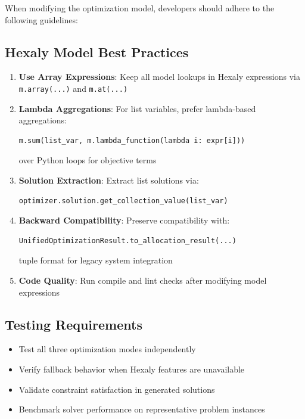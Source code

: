 \documentclass[11pt,a4paper]{article}
\begin{document}
When modifying the optimization model, developers should adhere to the following guidelines:

\subsection{Hexaly Model Best Practices}

\begin{enumerate}
    \item \textbf{Use Array Expressions}: Keep all model lookups in Hexaly expressions via \texttt{m.array(...)} and \texttt{m.at(...)}
    
    \item \textbf{Lambda Aggregations}: For list variables, prefer lambda-based aggregations:
    \begin{lstlisting}[style=pythoncode]
m.sum(list_var, m.lambda_function(lambda i: expr[i]))
    \end{lstlisting}
    over Python loops for objective terms
    
    \item \textbf{Solution Extraction}: Extract list solutions via:
    \begin{lstlisting}[style=pythoncode]
optimizer.solution.get_collection_value(list_var)
    \end{lstlisting}
    
    \item \textbf{Backward Compatibility}: Preserve compatibility with:
    \begin{lstlisting}[style=pythoncode]
UnifiedOptimizationResult.to_allocation_result(...)
    \end{lstlisting}
    tuple format for legacy system integration
    
    \item \textbf{Code Quality}: Run compile and lint checks after modifying model expressions
\end{enumerate}

\subsection{Testing Requirements}

\begin{itemize}
    \item Test all three optimization modes independently
    \item Verify fallback behavior when Hexaly features are unavailable
    \item Validate constraint satisfaction in generated solutions
    \item Benchmark solver performance on representative problem instances
\end{itemize}
\end{document}
